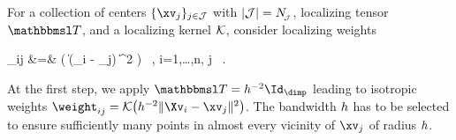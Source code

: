 For a collection of centers \( \{ \xv_{j} \}_{j \in \JJJ} \) with \( |\mathcal{J}| = N_{\!_{\mathcal{J}}} \),
localizing tensor \( \TEDR \), 
and a localizing kernel \( \mathcal{K} \), consider localizing weights
\begin{EQA}
	\weight_{ij}
	&=&
	\Kern\bigl( \| \TEDR(\Xv_{i} - \xv_{j}) \|^{2} \bigr) 
	\, ,
	\qquad
	i=1,\ldots,n,
	\quad
	j \in \JJJ
	\, .
\label{s7cuqkdwywdhbjwbfjwbdj}
\end{EQA}
At the first step, we apply \( \TEDR = \hiso^{-2} \Id_{\dimp} \)
leading to isotropic weights 
\( \weight_{ij} = \Kern\bigl( \hiso^{-2} \| \Xv_{i} - \xv_{j} \|^{2} \bigr) \).
The bandwidth \( h \) has to be selected to ensure sufficiently many points in almost every vicinity of \( \xv_{j} \)
of radius \( h \). 

